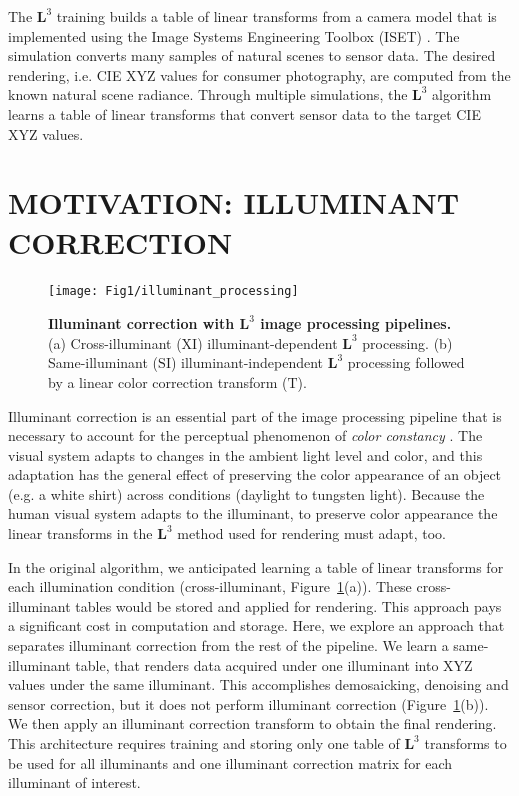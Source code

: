 \documentclass[]{spie}
\newcommand{\Lcube}{\boldsymbol L^3}
\newcommand{\XI}{\mathrm{XI}}
\newcommand{\SI}{\mathrm{SI}}
\newcommand{\TT}{\mathrm{T}}
\begin{document}
The $\Lcube$ training builds a table of linear transforms from a camera model that is implemented using the Image Systems Engineering Toolbox (ISET) \cite{Farrell2003,Farrell2012}. The simulation converts many samples of natural scenes to sensor data. The desired rendering, i.e. CIE XYZ values for consumer photography, are computed from the known natural scene radiance. Through multiple simulations, the $\Lcube$ algorithm learns a table of linear transforms that convert sensor data to the target CIE XYZ values. 

\section{MOTIVATION: ILLUMINANT CORRECTION}

\begin{figure}
\begin{center}
 \texttt{[image: Fig1/illuminant\_processing]}
\end{center}
\caption{ \textbf{Illuminant correction with $\Lcube$ image processing pipelines.} (a) Cross-illuminant ($\XI$) illuminant-dependent $\Lcube$ processing. (b) Same-illuminant ($\SI$) illuminant-independent $\Lcube$ processing followed by a linear color correction transform ($\TT$).}
\label{fig:sensordisplay}
\end{figure}

Illuminant correction is an essential part of the image processing pipeline that is necessary to account for the perceptual phenomenon of \textit{color constancy} \cite{Wandell1995}. The visual system adapts to changes in the ambient light level and color, and this adaptation has the general effect of preserving the color appearance of an object (e.g. a white shirt) across conditions (daylight to tungsten light). Because the human visual system adapts to the illuminant, to preserve color appearance the linear transforms in the $\Lcube$ method used for rendering must adapt, too.

In the original algorithm, we anticipated learning a table of linear transforms for each illumination condition (cross-illuminant, Figure~\ref{fig:sensordisplay}(a)). These cross-illuminant tables would be stored and applied for rendering. This approach pays a significant cost in computation and storage. Here, we explore an approach that separates illuminant correction from the rest of the pipeline. We learn a same-illuminant table, that renders data acquired under one illuminant into XYZ values under the same illuminant. This accomplishes demosaicking, denoising and sensor correction, but it does not perform illuminant correction (Figure~\ref{fig:sensordisplay}(b)). We then apply an illuminant correction transform to obtain the final rendering. This architecture requires training and storing only one table of $\Lcube$ transforms to be used for all illuminants and one illuminant correction matrix for each illuminant of interest. 
\end{document}
